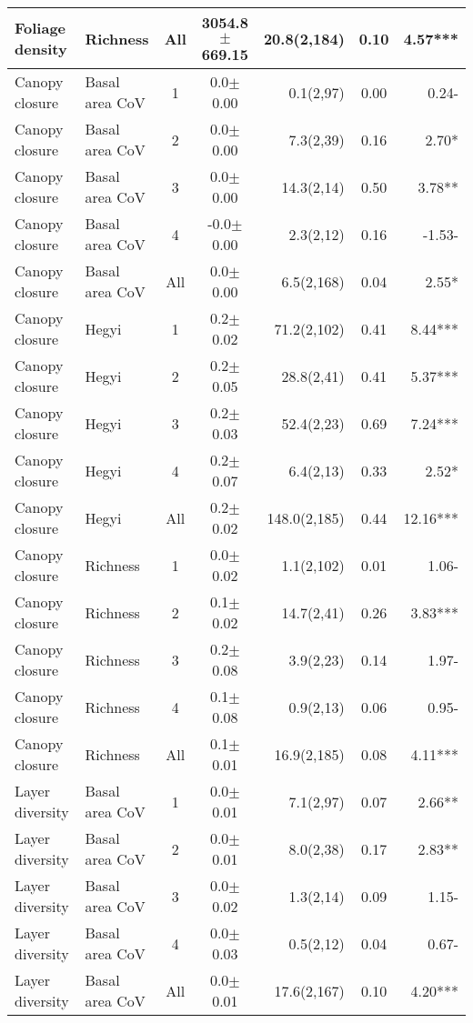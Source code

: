 \begin{longtable}{llcS[table-format=5.1(4.2)]rS[table-format=1.2]r}
  Foliage density & Richness & All & 3054.8$\pm$669.15 & 20.8(2,184) & 0.10 & 4.57*** \\ 
   \midrule
Canopy closure & Basal area CoV & 1 & 0.0$\pm$0.00 & 0.1(2,97) & 0.00 & 0.24- \\ 
  Canopy closure & Basal area CoV & 2 & 0.0$\pm$0.00 & 7.3(2,39) & 0.16 & 2.70* \\ 
  Canopy closure & Basal area CoV & 3 & 0.0$\pm$0.00 & 14.3(2,14) & 0.50 & 3.78** \\ 
  Canopy closure & Basal area CoV & 4 & -0.0$\pm$0.00 & 2.3(2,12) & 0.16 & -1.53- \\ 
  Canopy closure & Basal area CoV & All & 0.0$\pm$0.00 & 6.5(2,168) & 0.04 & 2.55* \\ 
   \midrule
Canopy closure & Hegyi & 1 & 0.2$\pm$0.02 & 71.2(2,102) & 0.41 & 8.44*** \\ 
  Canopy closure & Hegyi & 2 & 0.2$\pm$0.05 & 28.8(2,41) & 0.41 & 5.37*** \\ 
  Canopy closure & Hegyi & 3 & 0.2$\pm$0.03 & 52.4(2,23) & 0.69 & 7.24*** \\ 
  Canopy closure & Hegyi & 4 & 0.2$\pm$0.07 & 6.4(2,13) & 0.33 & 2.52* \\ 
  Canopy closure & Hegyi & All & 0.2$\pm$0.02 & 148.0(2,185) & 0.44 & 12.16*** \\ 
   \midrule
Canopy closure & Richness & 1 & 0.0$\pm$0.02 & 1.1(2,102) & 0.01 & 1.06- \\ 
  Canopy closure & Richness & 2 & 0.1$\pm$0.02 & 14.7(2,41) & 0.26 & 3.83*** \\ 
  Canopy closure & Richness & 3 & 0.2$\pm$0.08 & 3.9(2,23) & 0.14 & 1.97- \\ 
  Canopy closure & Richness & 4 & 0.1$\pm$0.08 & 0.9(2,13) & 0.06 & 0.95- \\ 
  Canopy closure & Richness & All & 0.1$\pm$0.01 & 16.9(2,185) & 0.08 & 4.11*** \\ 
   \midrule
Layer diversity & Basal area CoV & 1 & 0.0$\pm$0.01 & 7.1(2,97) & 0.07 & 2.66** \\ 
  Layer diversity & Basal area CoV & 2 & 0.0$\pm$0.01 & 8.0(2,38) & 0.17 & 2.83** \\ 
  Layer diversity & Basal area CoV & 3 & 0.0$\pm$0.02 & 1.3(2,14) & 0.09 & 1.15- \\ 
  Layer diversity & Basal area CoV & 4 & 0.0$\pm$0.03 & 0.5(2,12) & 0.04 & 0.67- \\ 
  Layer diversity & Basal area CoV & All & 0.0$\pm$0.01 & 17.6(2,167) & 0.10 & 4.20*** \\ 

\end{longtable}

